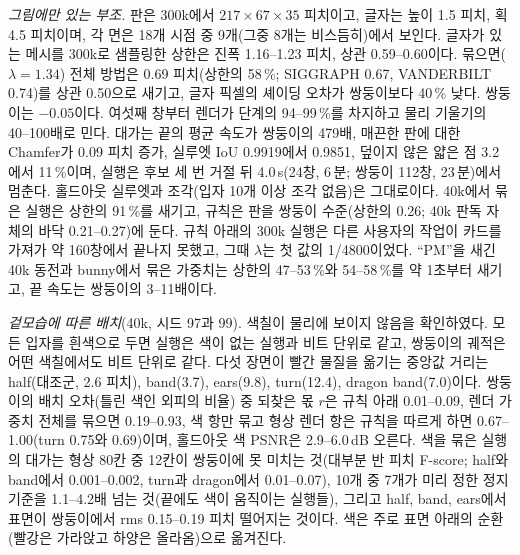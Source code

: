 \textit{그림에만 있는 부조.} 판은 300k에서 $217\times67\times35$ 피치이고, 글자는 높이 1.5 피치, 획 4.5 피치이며, 각 면은
18개 시점 중 9개(그중 8개는 비스듬히)에서 보인다. 글자가 있는 메시를 300k로 샘플링한 상한은 진폭 1.16--1.23 피치, 상관
0.59--0.60이다. 묶으면($\lambda=1.34$) 전체 방법은 0.69 피치(상한의 58\,\%; SIGGRAPH 0.67, VANDERBILT 0.74)를 상관 0.50으로
새기고, 글자 픽셀의 셰이딩 오차가 쌍둥이보다 40\,\% 낮다. 쌍둥이는 $-0.05$이다. 여섯째 창부터 렌더가 단계의 94--99\,\%를
차지하고 물리 기울기의 40--100배로 민다. 대가는 끝의 평균 속도가 쌍둥이의 479배, 매끈한 판에 대한 Chamfer가 0.09 피치 증가,
실루엣 IoU 0.9919에서 0.9851, 덮이지 않은 얇은 점 3.2에서 11\,\%이며, 실행은 후보 세 번 거절 뒤 4.0\,s(24창, 6\,분; 쌍둥이
112창, 23\,분)에서 멈춘다. 홀드아웃 실루엣과 조각(입자 10개 이상 조각 없음)은 그대로이다. 40k에서 묶은 실행은 상한의
91\,\%를 새기고, 규칙은 판을 쌍둥이 수준(상한의 0.26; 40k 판독 자체의 바닥 0.21--0.27)에 둔다. 규칙 아래의 300k 실행은 다른
사용자의 작업이 카드를 가져가 약 160창에서 끝나지 못했고, 그때 $\lambda$는 첫 값의 1/4800이었다. ``PM''을 새긴 40k 동전과
bunny에서 묶은 가중치는 상한의 47--53\,\%와 54--58\,\%를 약 1초부터 새기고, 끝 속도는 쌍둥이의 3--11배이다.

\textit{겉모습에 따른 배치}(40k, 시드 97과 99). 색칠이 물리에 보이지 않음을 확인하였다. 모든 입자를 흰색으로 두면 실행은 색이
없는 실행과 비트 단위로 같고, 쌍둥이의 궤적은 어떤 색칠에서도 비트 단위로 같다. 다섯 장면이 빨간 물질을 옮기는 중앙값
거리는 half(대조군, 2.6 피치), band(3.7), ears(9.8), turn(12.4), dragon band(7.0)이다. 쌍둥이의 배치 오차(틀린 색인 외피의
비율) 중 되찾은 몫 $r$은 규칙 아래 0.01--0.09, 렌더 가중치 전체를 묶으면 0.19--0.93, 색 항만 묶고 형상 렌더 항은 규칙을
따르게 하면 0.67--1.00(turn 0.75와 0.69)이며, 홀드아웃 색 PSNR은 2.9--6.0\,dB 오른다. 색을 묶은 실행의 대가는 형상 80칸 중
12칸이 쌍둥이에 못 미치는 것(대부분 반 피치 F-score; half와 band에서 0.001--0.002, turn과 dragon에서 0.01--0.07), 10개 중
7개가 미리 정한 정지 기준을 1.1--4.2배 넘는 것(끝에도 색이 움직이는 실행들), 그리고 half, band, ears에서 표면이 쌍둥이에서
rms 0.15--0.19 피치 떨어지는 것이다. 색은 주로 표면 아래의 순환(빨강은 가라앉고 하양은 올라옴)으로 옮겨진다.
